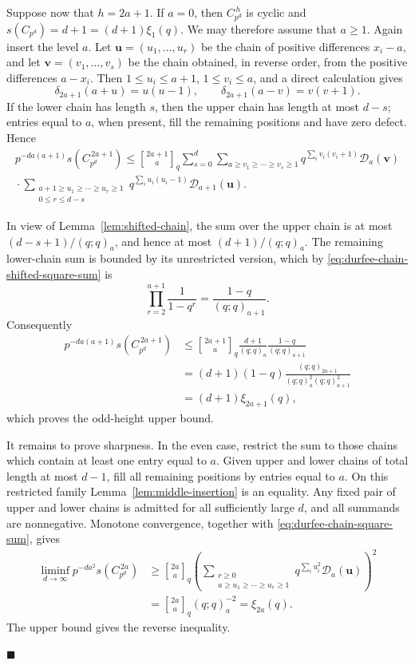 \documentclass[a4paper,11pt,reqno]{amsart}
\theoremstyle{plain}
\theoremstyle{remark}
\numberwithin{equation}{section}
\newcommand{\qgauss}[2]{\genfrac{[}{]}{0pt}{}{#1}{#2}_q}
\renewcommand{\leq}{\leqslant}
\renewcommand{\geq}{\geqslant}
\newenvironment{proofof}{{\bf Proof. }}{\hfill $\blacksquare$ \\}
\begin{document}
\begin{proofof}
Suppose now that $h=2a+1$. If $a=0$, then $C_{p^d}^{\,h}$ is cyclic and
$s(C_{p^d})=d+1=(d+1)\xi_1(q)$. We may therefore assume that $a\geq 1$. Again
insert the level $a$. Let $\mathbf u=(u_1,\ldots,u_r)$ be the chain of positive
differences $x_i-a$, and let $\mathbf v=(v_1,\ldots,v_s)$ be the chain
obtained, in reverse order, from the positive differences $a-x_i$. Then
$1\leq u_i\leq a+1$, $1\leq v_i\leq a$, and a direct calculation gives
\[
        \delta_{2a+1}(a+u)=u(u-1),
        \qquad
        \delta_{2a+1}(a-v)=v(v+1).
\]
If the lower chain has length $s$, then the upper chain has length at most
$d-s$; entries equal to $a$, when present, fill the remaining positions and have
zero defect. Hence
\begin{multline*}
        p^{-da(a+1)}s(C_{p^d}^{\,2a+1})
        \leq
        \qgauss{2a+1}{a}
        \sum_{s=0}^{d}
        \sum_{a\geq v_1\geq\cdots\geq v_s\geq 1}
        q^{\sum_i v_i(v_i+1)}\mathcal D_a(\mathbf v)  \\
        {}\cdot
        \sum_{\substack{a+1\geq u_1\geq\cdots\geq u_r\geq 1\\0\leq r\leq d-s}}
        q^{\sum_i u_i(u_i-1)}\mathcal D_{a+1}(\mathbf u).
\end{multline*}

In view of Lemma~\ref{lem:shifted-chain}, 
the sum over the upper chain is at most $(d-s+1)/(q;q)_a$, 
and hence at most $(d+1)/(q;q)_a$. 
The remaining lower-chain sum is bounded by its unrestricted version, which by
\eqref{eq:durfee-chain-shifted-square-sum} is
\[
        \prod_{r=2}^{a+1}\frac{1}{1-q^r}
        =
        \frac{1-q}{(q;q)_{a+1}}.
\]
Consequently
\[
\begin{aligned}
        p^{-da(a+1)}s(C_{p^d}^{\,2a+1})
        &\leq
        \qgauss{2a+1}{a}
        \frac{d+1}{(q;q)_a}\frac{1-q}{(q;q)_{a+1}}  \\
        &=(d+1)(1-q)
        \frac{(q;q)_{2a+1}}{(q;q)_a^2(q;q)_{a+1}^2} \\
        &=(d+1)\xi_{2a+1}(q),
\end{aligned}
\]
which proves the odd-height upper bound.

It remains to prove sharpness. In the even case, restrict the sum to those
chains which contain at least one entry equal to $a$. Given upper and lower
chains of total length at most $d-1$, fill all remaining positions by entries
equal to $a$. On this restricted family Lemma~\ref{lem:middle-insertion} is an
equality. Any fixed pair of upper and lower chains is admitted for all
sufficiently large $d$, and all summands are nonnegative. Monotone convergence,
together with \eqref{eq:durfee-chain-square-sum}, gives
\[
\begin{aligned}
        \liminf_{d\to\infty}p^{-da^2}s(C_{p^d}^{\,2a})
        &\geq
        \qgauss{2a}{a}
        \left(\sum_{\substack{r\geq 0\\ a\geq u_1\geq\cdots\geq u_r\geq 1}}
        q^{\sum_i u_i^2}\mathcal D_a(\mathbf u)\right)^2  \\
        &=
        \qgauss{2a}{a}(q;q)_a^{-2}
        =\xi_{2a}(q).
\end{aligned}
\]
The upper bound gives the reverse inequality.


\end{proofof}
\end{document}
